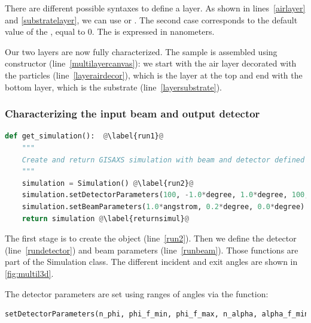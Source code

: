 There are different possible syntaxes to define a layer. As shown in
lines~\ref{airlayer} and \ref{substratelayer}, we can use
 or
. The second case corresponds
to the default value of the , equal to 0. The  is
expressed in  nanometers.

Our two layers are now fully characterized. The sample is assembled using
 constructor (line~\ref{multilayercanvas}): we start with the air layer decorated
with the particles (line~\ref{layerairdecor}), which is the layer at
the top and end with the bottom layer, which is the
substrate (line~\ref{layersubstrate}).

\subsubsection{Characterizing the input beam and output detector}

\begin{lstlisting}[language=python, style=eclipseboxed,name=ex1,nolol]
def get_simulation():  @\label{run1}@
    """
    Create and return GISAXS simulation with beam and detector defined
    """
    simulation = Simulation() @\label{run2}@
    simulation.setDetectorParameters(100, -1.0*degree, 1.0*degree, 100, 0.0*degree, 2.0*degree) @\label{rundetector}@
    simulation.setBeamParameters(1.0*angstrom, 0.2*degree, 0.0*degree) @\label{runbeam}@
    return simulation @\label{returnsimul}@
\end{lstlisting}
The first stage is to create the  object (line~\ref{run2}). Then we define the detector (line~\ref{rundetector}) and beam
parameters (line~\ref{runbeam}). %
Those functions are part of the Simulation class.
The different incident and exit angles are shown in \cref{fig:multil3d}.

The detector parameters are set using ranges of angles via
the function:

\begin{lstlisting}[language=python, style=eclipse,numbers=none]
setDetectorParameters(n_phi, phi_f_min, phi_f_max, n_alpha, alpha_f_min, alpha_f_max),
\end{lstlisting}


